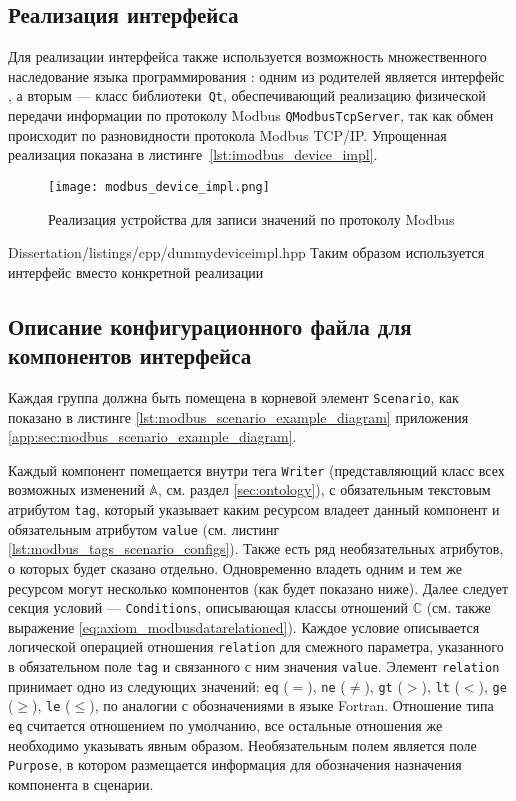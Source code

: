 \subsection{Реализация интерфейса \mbdevice}
Для реализации интерфейса \mbdevice также используется возможность множественного наследование языка программирования \cpp:
одним из родителей является интерфейс \mbdevice,
а вторым --- класс библиотеки~\texttt{Qt}, обеспечивающий реализацию физической передачи информации по протоколу Modbus
\texttt{QModbusTcpServer}, так как обмен происходит по разновидности протокола Modbus TCP/IP.
Упрощенная реализация показана в листинге~\ref{lst:imodbus_device_impl}.
\begin{figure}[hb!]\begin{center}
        \texttt{[image: modbus\_device\_impl.png]}
        \caption[Реализация интерфейса устройства записи.]
            {Реализация устройства для записи значений по протоколу Modbus}\label{fig:modbus_device_imp}
\end{center}\end{figure}

        {Dissertation/listings/cpp/dummydeviceimpl.hpp}
Таким образом используется интерфейс вместо конкретной реализации \cite[стр. 47-48]{book:pattern:head_first}


\subsection{Описание конфигурационного файла для компонентов интерфейса \mbwriter}
Каждая группа должна быть помещена в корневой элемент \texttt{Scenario},
как показано в листинге \ref{lst:modbus_scenario_example_diagram} приложения \ref{app:sec:modbus_scenario_example_diagram}.

Каждый компонент помещается внутри тега \texttt{Writer} (представляющий класс всех возможных изменений $\mathbb{A}$, см. раздел \ref{sec:ontology}),
с обязательным текстовым атрибутом \texttt{tag}, который указывает каким ресурсом владеет данный компонент
и обязательным атрибутом \texttt{value} (см. листинг \ref{lst:modbus_tags_scenario_configs}).
Также есть ряд необязательных атрибутов, о которых будет сказано отдельно. 
Одновременно владеть одним и тем же ресурсом могут несколько компонентов (как будет показано ниже).
Далее следует секция условий --- \texttt{Conditions},
описывающая классы отношений $\mathbb{C}$ (см. также выражение \eqref{eq:axiom_modbusdatarelationed}).
Каждое условие описывается логической операцией отношения \texttt{relation} для смежного параметра,
указанного в обязательном поле \texttt{tag} и связанного с ним значения \texttt{value}.
Элемент \texttt{relation} принимает одно из следующих значений:
\texttt{eq} ($=$),
\texttt{ne} ($\neq$),
\texttt{gt} ($>$),
\texttt{lt} ($<$),
\texttt{ge} ($\geq$),
\texttt{le} ($\leq$), по аналогии с обозначениями в языке Fortran.
Отношение типа \texttt{eq} считается отношением по умолчанию,
все остальные отношения же необходимо указывать явным образом.
Необязательным полем является поле \texttt{Purpose}, в котором размещается информация для
обозначения назначения компонента в сценарии.

